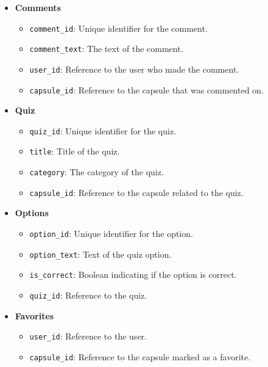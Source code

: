 \begin{itemize}
    \item \textbf{Comments}
    \begin{itemize}
        \item \texttt{comment\_id}: Unique identifier for the comment.
        \item \texttt{comment\_text}: The text of the comment.
        \item \texttt{user\_id}: Reference to the user who made the comment.
        \item \texttt{capsule\_id}: Reference to the capsule that was commented on.
    \end{itemize}
    
    \item \textbf{Quiz}
    \begin{itemize}
        \item \texttt{quiz\_id}: Unique identifier for the quiz.
        \item \texttt{title}: Title of the quiz.
        \item \texttt{category}: The category of the quiz.
        \item \texttt{capsule\_id}: Reference to the capsule related to the quiz.
    \end{itemize}
    \item \textbf{Options}
    \begin{itemize}
        \item \texttt{option\_id}: Unique identifier for the option.
        \item \texttt{option\_text}: Text of the quiz option.
        \item \texttt{is\_correct}: Boolean indicating if the option is correct.
        \item \texttt{quiz\_id}: Reference to the quiz.
    \end{itemize}
    
    \item \textbf{Favorites}
    \begin{itemize}
        \item \texttt{user\_id}: Reference to the user.
        \item \texttt{capsule\_id}: Reference to the capsule marked as a favorite.
    \end{itemize}
\end{itemize}
